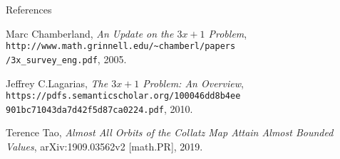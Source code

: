 \documentclass[hyperref={colorlinks,allcolors=black}]{beamer}
\begin{document}
\begin{frame}{References}
\begin{thebibliography}{4}

 Marc Chamberland, 
    \textit{An Update on the $3x+1$ Problem},
        \texttt{http://www.math.grinnell.edu/\~{}chamberl/papers\\
        /3x\_survey\_eng.pdf},
    2005.

 Jeffrey C.Lagarias, 
    \textit{The $3x+1$ Problem: An Overview},
    \texttt{https://pdfs.semanticscholar.org/100046dd8b4ee\\
        901bc71043da7d42f5d87ca0224.pdf},
    2010.

 Terence Tao, \textit{Almost All Orbits of the Collatz Map Attain
    Almost Bounded Values}, arXiv:1909.03562v2 [math.PR], 2019.

\end{thebibliography}
\end{frame}
\end{document}
